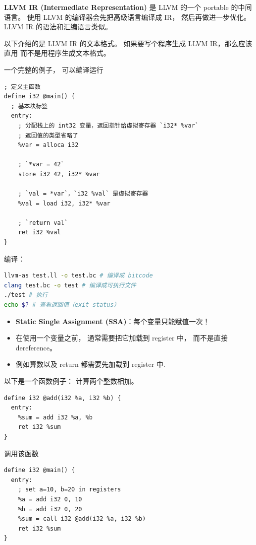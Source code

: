 

\textbf{LLVM IR (Intermediate Representation)} 是 LLVM 的一个 portable 的中间语言。 使用 LLVM 的编译器会先把高级语言编译成 IR， 然后再做进一步优化。 LLVM IR 的语法和汇编语言类似。

以下介绍的是 LLVM IR 的文本格式。 如果要写个程序生成 LLVM IR，那么应该直用  而不是用程序生成文本格式。

一个完整的例子， 可以编译运行
\begin{lstlisting}[language=none,caption=test.ll]
; 定义主函数
define i32 @main() {
  ; 基本块标签
  entry:
    ; 分配栈上的 int32 变量，返回指针给虚拟寄存器 `i32* %var`
    ; 返回值的类型省略了
    %var = alloca i32

    ; `*var = 42`
    store i32 42, i32* %var

    ; `val = *var`，`i32 %val` 是虚拟寄存器
    %val = load i32, i32* %var

    ; `return val`
    ret i32 %val
}
\end{lstlisting}

编译：
\begin{lstlisting}[language=bash]
llvm-as test.ll -o test.bc # 编译成 bitcode
clang test.bc -o test # 编译成可执行文件
./test # 执行
echo $? # 查看返回值（exit status）
\end{lstlisting}

\begin{itemize}
\item \textbf{Static Single Assignment (SSA)}：每个变量只能赋值一次！
\item  在使用一个变量之前， 通常需要把它加载到 register 中， 而不是直接 dereference。
\item 例如算数以及 return 都需要先加载到 register 中.
\end{itemize}

以下是一个函数例子： 计算两个整数相加。
\begin{lstlisting}[language=none]
define i32 @add(i32 %a, i32 %b) {
  entry:
    %sum = add i32 %a, %b
    ret i32 %sum
}
\end{lstlisting}

调用该函数
\begin{lstlisting}[language=none]
define i32 @main() {
  entry:
    ; set a=10, b=20 in registers
    %a = add i32 0, 10
    %b = add i32 0, 20
    %sum = call i32 @add(i32 %a, i32 %b)
    ret i32 %sum
}
\end{lstlisting}

